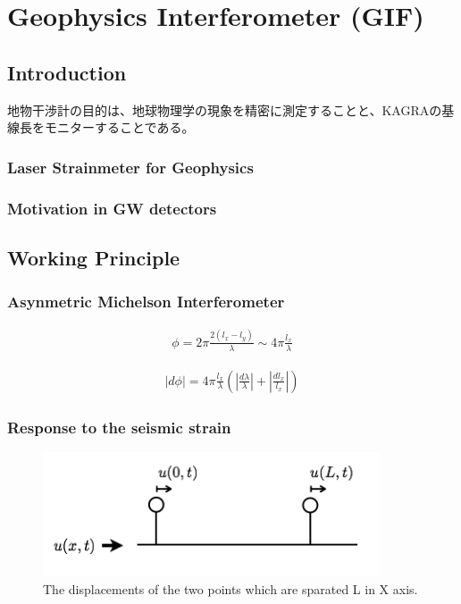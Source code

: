 \chapter{Geophysics Interferometer (GIF)}



\section{Introduction}
地物干渉計の目的は、地球物理学の現象を精密に測定することと、KAGRAの基線長をモニターすることである。
\subsection{Laser Strainmeter for Geophysics}



\subsection{Motivation in GW detectors}


\section{Working Principle}

\subsection{Asynmetric Michelson Interferometer}

\begin{eqnarray}
  \phi = 2\pi\frac{2(l_x-l_y)}{\lambda}\sim4\pi\frac{l_x}{\lambda}
\end{eqnarray}

\begin{eqnarray}
  |d\phi| = 4\pi\frac{l_x}{\lambda}\left( \left|\frac{d\lambda}{\lambda}\right| + \left|\frac{dl_x}{l_x}\right| \right)
\end{eqnarray}


\subsection{Response to the seismic strain}
\begin{figure}[h]
  \begin{center}
    \includegraphics[width=10.0cm]{./img_chap4/img410.png}
    \caption{The displacements of the two points which are sparated L in X axis. }
  \end{center}
\end{figure}

